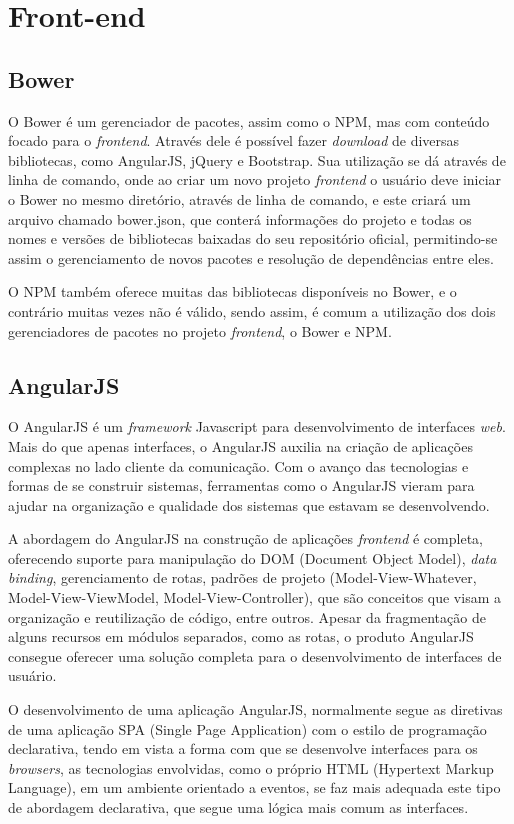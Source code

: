 \section{Front-end}

\subsection{Bower}
O Bower \cite{bower} é um gerenciador de pacotes, assim como o NPM, mas com conteúdo focado para o \textit{frontend}. Através dele é possível fazer \textit{download} de diversas bibliotecas, como AngularJS, jQuery e Bootstrap. Sua utilização se dá através de linha de comando, onde ao criar um novo projeto \textit{frontend} o usuário deve iniciar o Bower no mesmo diretório, através de linha de comando, e este criará um arquivo chamado bower.json, que conterá informações do projeto e todas os nomes e versões de bibliotecas baixadas do seu repositório oficial, permitindo-se assim o gerenciamento de novos pacotes e resolução de dependências entre eles.

O NPM também oferece muitas das bibliotecas disponíveis no Bower, e o contrário muitas vezes não é válido, sendo assim, é comum a utilização dos dois gerenciadores de pacotes no projeto \textit{frontend}, o Bower e NPM.

\subsection{AngularJS}
O AngularJS \cite{angular} é um \textit{framework} Javascript para desenvolvimento de interfaces \textit{web}. Mais do que apenas interfaces, o AngularJS auxilia na criação de aplicações complexas no lado cliente da comunicação. Com o avanço das tecnologias e formas de se construir sistemas, ferramentas como o AngularJS vieram para ajudar na organização e qualidade dos sistemas que estavam se desenvolvendo.

A abordagem do AngularJS na construção de aplicações \textit{frontend} é completa, oferecendo suporte para manipulação do DOM (Document Object Model), \textit{data binding}, gerenciamento de rotas, padrões de projeto (Model-View-Whatever, Model-View-ViewModel, Model-View-Controller), que são conceitos que visam a organização e reutilização de código, entre outros. Apesar da fragmentação de alguns recursos em módulos separados, como as rotas, o produto AngularJS consegue oferecer uma solução completa para o desenvolvimento de interfaces de usuário.

O desenvolvimento de uma aplicação AngularJS, normalmente segue as diretivas de uma aplicação SPA (Single Page Application) com o estilo de programação declarativa, tendo em vista a forma com que se desenvolve interfaces para os \textit{browsers}, as tecnologias envolvidas, como o próprio HTML (Hypertext Markup Language), em um ambiente orientado a eventos, se faz mais adequada este tipo de abordagem declarativa, que segue uma lógica mais comum as interfaces.


